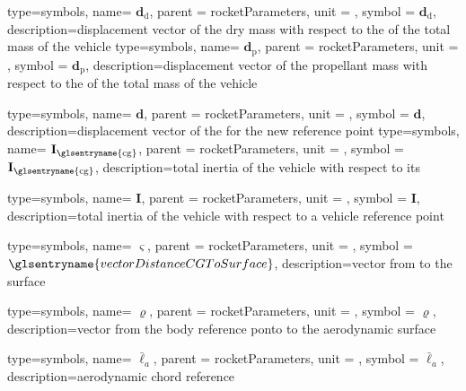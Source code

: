{type=symbols,
  name= \ensuremath{\mathbf{d}_\mathrm{d}},
  parent = {rocketParameters},
  unit = \unexpanded{\si{\meter}},
  symbol = \ensuremath{\mathbf{d}_\mathrm{d}},
  description={displacement vector of the dry mass with respect to the  of the total mass of the vehicle}
}
{type=symbols,
  name= \ensuremath{\mathbf{d}_\mathrm{p}},
  parent = {rocketParameters},
  unit = \unexpanded{\si{\meter}},
  symbol = \ensuremath{\mathbf{d}_\mathrm{p}},
  description={displacement vector of the propellant mass with respect to the  of the total mass of the vehicle}
}

{type=symbols,
  name= \ensuremath{\mathbf{d}},
  parent = {rocketParameters},
  unit = \unexpanded{\si{\meter}},
  symbol = \ensuremath{\mathbf{d}},
  description={displacement vector of the   for the new reference point}
}
{type=symbols,
  name= \ensuremath{\mathbf{I}_\mathrm{\glsentryname{cg}}},
  parent = {rocketParameters},
  unit = \unexpanded{\si{\kilogram\meter\squared}},
  symbol = \ensuremath{\mathbf{I}_\mathrm{\glsentryname{cg}}},
  description={total inertia of the vehicle with respect to its }
}

{type=symbols,
  name= \ensuremath{\mathbf{I}},
  parent = {rocketParameters},
  unit = \unexpanded{\si{\kilogram\meter\squared}},
  symbol = \ensuremath{\mathbf{I}},
  description={total inertia of the vehicle with respect to a vehicle reference point}
}

{type=symbols,
  name= \ensuremath{\boldsymbol{\varsigma}},
  parent = {rocketParameters},
  unit = \unexpanded{\si{\meter}},
  symbol = \ensuremath{\glsentryname{vectorDistanceCGToSurface}},
  description={vector from  to the surface}  
}

{type=symbols,
  name= \ensuremath{\boldsymbol{\varrho}},
  parent = {rocketParameters},
  unit = \unexpanded{\si{\meter}},
  symbol = \ensuremath{\boldsymbol{\varrho}},
  description={vector from the body reference ponto to the aerodynamic surface}  
}

{type=symbols,
  name= \ensuremath{\bar{\ell}_{a}},
  parent = {rocketParameters},
  unit = \unexpanded{\si{\meter}},
  symbol = \ensuremath{\bar{\ell}_{a}},
  description={aerodynamic chord reference}
}